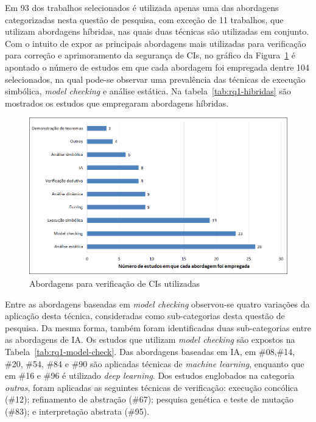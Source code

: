 Em 93 dos trabalhos selecionados é utilizada apenas uma das abordagens categorizadas nesta questão de pesquisa, com exceção de 11 trabalhos, que utilizam abordagens híbridas, nas quais duas técnicas são utilizadas em conjunto. Com o intuito de expor as principais abordagens mais utilizadas para verificação para correção e aprimoramento da segurança de CIs, no gráfico da Figura~\ref{fig:rq1-abordagens} é apontado o número de estudos em que cada abordagem foi empregada dentre 104 selecionados, na qual pode-se observar uma prevalência das técnicas de execução simbólica, \textit{model checking} e análise estática. Na tabela~\ref{tab:rq1-hibridas} são mostrados os estudos que empregaram abordagens híbridas.

\begin{figure}[!htb]
 \caption{Abordagens para verificação de CIs utilizadas}
 \label{fig:rq1-abordagens}
 \centering
 \includegraphics[scale=0.6]{figuras/rq1-abordagens.png}
 \fdadospesquisa
\end{figure}



Entre as abordagens baseadas em \textit{model checking} observou-se quatro variações da aplicação desta técnica, consideradas como sub-categorias desta questão de pesquisa. Da mesma forma, também foram identificadas duas sub-categorias entre as abordagens de IA. Os estudos que utilizam \textit{model checking} são expostos na Tabela~\ref{tab:rq1-model-check}. Das abordagens baseadas em IA, em \#08,\#14, \#20, \#54, \#84 e \#90 são aplicadas técnicas de \textit{machine learning}, enquanto que em \#16 e \#96 é utilizado \textit{deep learning}. Dos estudos englobados na categoria \textit{outras}, foram aplicadas as seguintes técnicas de verificação: execução concólica (\#12); refinamento de abstração (\#67); pesquisa genética e teste de mutação (\#83); e interpretação abstrata (\#95).

